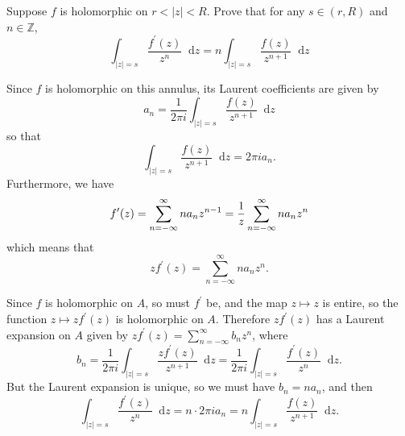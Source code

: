 \documentclass{article}
\newcommand\dif{\mathop{}\!\mathrm{d}}
\newcounter{Problem}
\newenvironment{Problem}{\begin{Exercise}[name={Problem},
                                          counter={Problem}]}
                        {\end{Exercise}}
\begin{document}
\begin{Problem}
Suppose $f$ is holomorphic on $r < |z| < R$. Prove that for any
$s \in (r, R)$ and $n \in \mathbb{Z}$,
$$
   \int_{|z| = s} \frac{f^\prime(z)}{z^n} \dif z
= n\int_{|z| = s} \frac{f(z)}{z^{n+1}} \dif z
$$
\end{Problem}

\begin{Answer}
Since $f$ is holomorphic on this annulus, its Laurent
coefficients are given by
$$
  a_n 
= \frac{1}{2 \pi i} 
  \int_{|z| = s}
    \frac{f(z)}{z^{n+1}}
    \dif z
$$
so that
$$
\int_{|z| = s}
    \frac{f(z)}{z^{n+1}}
    \dif z
= 2 \pi i a_n.
$$
Furthermore, we have
$$
   f^\prime(z)
= \sum_{n=-\infty}^\infty n a_n z^{n-1} \\
= \frac{1}{z} \sum_{n=-\infty}^{\infty} n a_n z^n 
$$
which means that
$$
z f^\prime(z) = \sum_{n=-\infty}^\infty n a_n z^n.
$$

Since $f$ is holomorphic on $A$, so must $f^\prime$ be, and the
map $z \mapsto z$ is entire, so the function $z \mapsto z f^\prime(z)$
is holomorphic on $A$. Therefore $z f^\prime(z)$ has a Laurent expansion on $A$
given by
$z f^\prime(z) = \sum_{n=-\infty}^\infty b_n z^n$, where
$$
  b_n
= \frac{1}{2 \pi i}
  \int_{|z| = s}
    \frac{z f^\prime(z)}{z^{n+1}}
    \dif z
= \frac{1}{2 \pi i}
  \int_{|z| = s}
    \frac{f^\prime(z)}{z^n}
    \dif z.
$$
But the Laurent expansion is unique, so we must have $b_n = n a_n$, and then
$$
  \int_{|z| = s}
    \frac{f^\prime(z)}{z^n}
    \dif z
= n \cdot 2 \pi i a_n
= n \int_{|z| = s}
      \frac{f(z)}{z^{n+1}}
      \dif z.
$$

\end{Answer}
\end{document}
